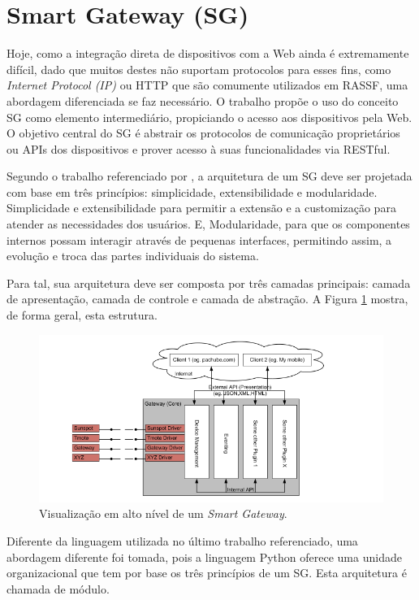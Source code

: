 \documentclass[12pt,a4paper,oneside]{report}
\begin{document}
\section{Smart Gateway (SG)}

Hoje, como a integração direta de dispositivos com a Web ainda é extremamente difícil, dado que muitos destes não suportam protocolos para esses fins, como \emph{Internet Protocol (IP)} ou HTTP que são comumente utilizados em RASSF, uma abordagem diferenciada se faz necessário. O trabalho \cite{wotdovad} propõe o uso do conceito SG como elemento intermediário, propiciando o acesso aos dispositivos pela Web. O objetivo central do SG é abstrair os protocolos de comunicação proprietários ou APIs dos dispositivos e prover acesso à suas funcionalidades via RESTful.

Segundo o trabalho referenciado por \cite{sgtriwiguiboh}, a arquitetura de um SG deve ser projetada com base em três princípios: simplicidade, extensibilidade e modularidade. Simplicidade e extensibilidade para permitir a extensão e a customização para atender as necessidades dos usuários. E, Modularidade, para que os componentes internos possam interagir através de pequenas interfaces, permitindo assim, a evolução e troca das partes individuais do sistema.

Para tal, sua arquitetura deve ser composta por três camadas principais: camada de apresentação, camada de controle e camada de abstração. A Figura \ref{fig:estrutura-sg} mostra, de forma geral, esta estrutura.

\begin{figure}[htbp]
   \centering
    \includegraphics[width=1\textwidth]{figuras/figura_2_8}
    \caption{Visualização em alto nível de um \emph{Smart Gateway}.}
    \label{fig:estrutura-sg}
\end{figure}

Diferente da linguagem utilizada no último trabalho referenciado, uma abordagem diferente foi tomada, pois a linguagem Python oferece uma unidade organizacional que tem por base os três princípios de um SG. Esta arquitetura é chamada de módulo.
\end{document}

